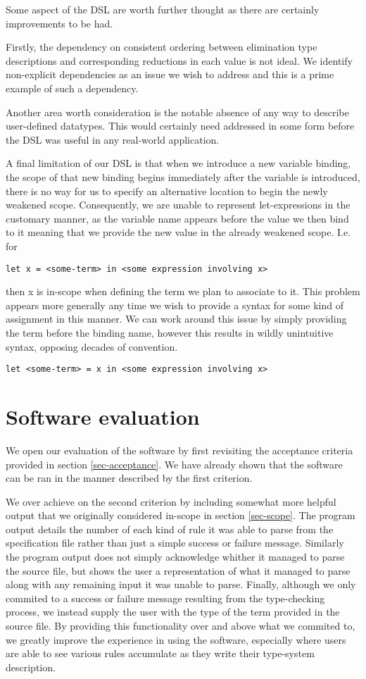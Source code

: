 Some aspect of the DSL are worth further thought as there are
certainly improvements to be had.

Firstly, the dependency on consistent ordering between elimination
type descriptions and corresponding reductions in each value is not
ideal. We identify non-explicit dependencies as an issue we wish to
address and this is a prime example of such a dependency.

Another area worth consideration is the notable absence of any way to
describe user-defined datatypes. This would certainly need addressed
in some form before the DSL was useful in any real-world application.

A final limitation of our DSL is that when we introduce a new variable
binding, the scope of that new binding begins immediately after the
variable is introduced, there is no way for us to specify an
alternative location to begin the newly weakened scope. Consequently,
we are unable to represent let-expressions in the customary manner, as
the variable name appears before the value we then bind to it meaning
that we provide the new value in the already weakened scope. I.e. for
\begin{verbatim}
let x = <some-term> in <some expression involving x>
\end{verbatim}
then x is in-scope when defining the term we plan to associate to
it. This problem appears more generally any time we wish to provide a
syntax for some kind of assignment in this manner. We can work around
this issue by simply providing the term before the binding name,
however this results in wildly unintuitive syntax, opposing decades of
convention.
\begin{verbatim}
let <some-term> = x in <some expression involving x>
\end{verbatim}

\section{Software evaluation}

We open our evaluation of the software by first revisiting the
acceptance criteria provided in section \ref{sec-acceptance}. We have
already shown that the software can be ran in the manner described by
the first criterion.

We over achieve on the second criterion by including somewhat more
helpful output that we originally considered in-scope in section
\ref{sec-scope}. The program output details the number of each kind of
rule it was able to parse from the specification file rather than just
a simple success or failure message. Similarly the program output does
not simply acknowledge whither it managed to parse the source file,
but shows the user a representation of what it managed to parse along
with any remaining input it was unable to parse. Finally, although we
only commited to a success or failure message resulting from the
type-checking process, we instead supply the user with the type of the
term provided in the source file. By providing this functionality over
and above what we commited to, we greatly improve the experience in
using the software, especially where users are able to see various
rules accumulate as they write their type-system description.

